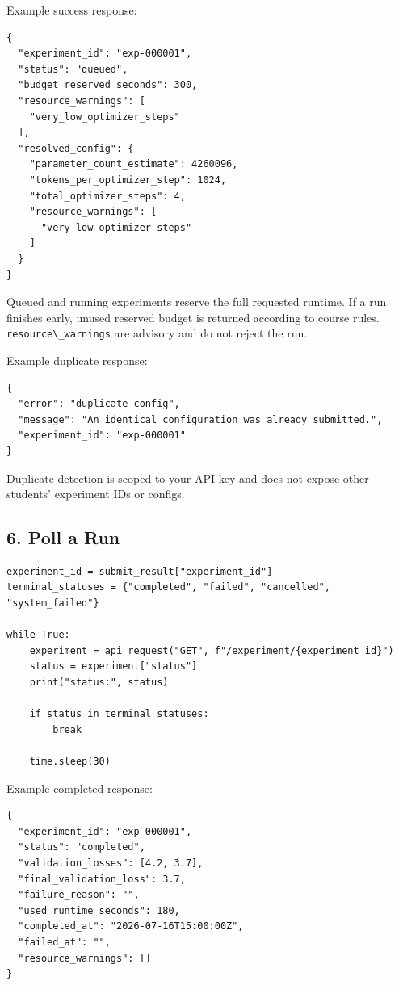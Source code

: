 \documentclass[
]{article}
\newcommand{\passthrough}[1]{#1}
\begin{document}
Example success response:

\begin{verbatim}
{
  "experiment_id": "exp-000001",
  "status": "queued",
  "budget_reserved_seconds": 300,
  "resource_warnings": [
    "very_low_optimizer_steps"
  ],
  "resolved_config": {
    "parameter_count_estimate": 4260096,
    "tokens_per_optimizer_step": 1024,
    "total_optimizer_steps": 4,
    "resource_warnings": [
      "very_low_optimizer_steps"
    ]
  }
}
\end{verbatim}

Queued and running experiments reserve the full requested runtime. If a
run finishes early, unused reserved budget is returned according to
course rules. \passthrough{\lstinline!resource\_warnings!} are advisory
and do not reject the run.

Example duplicate response:

\begin{verbatim}
{
  "error": "duplicate_config",
  "message": "An identical configuration was already submitted.",
  "experiment_id": "exp-000001"
}
\end{verbatim}

Duplicate detection is scoped to your API key and does not expose other
students' experiment IDs or configs.

\hypertarget{poll-a-run}{%
\subsection{6. Poll a Run}\label{poll-a-run}}

\begin{verbatim}
experiment_id = submit_result["experiment_id"]
terminal_statuses = {"completed", "failed", "cancelled", "system_failed"}

while True:
    experiment = api_request("GET", f"/experiment/{experiment_id}")
    status = experiment["status"]
    print("status:", status)

    if status in terminal_statuses:
        break

    time.sleep(30)
\end{verbatim}

Example completed response:

\begin{verbatim}
{
  "experiment_id": "exp-000001",
  "status": "completed",
  "validation_losses": [4.2, 3.7],
  "final_validation_loss": 3.7,
  "failure_reason": "",
  "used_runtime_seconds": 180,
  "completed_at": "2026-07-16T15:00:00Z",
  "failed_at": "",
  "resource_warnings": []
}
\end{verbatim}
\end{document}
